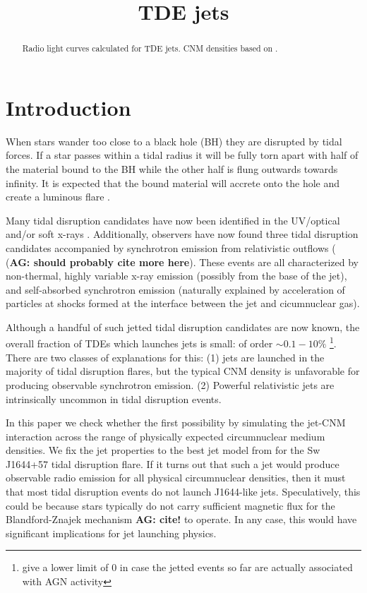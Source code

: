 \documentclass[usenatbib,fleqn]{mnras}
\title{TDE jets}
\begin{document}
\begin{abstract}
  Radio light curves calculated for TDE jets. CNM
  densities based on \citet{Generozov+2015}. 
\end{abstract}
\section{Introduction}
\label{sec:intro}
When stars wander too close to a black hole (BH) they are disrupted by
tidal forces. If a star passes within a tidal radius it will be fully
torn apart with half of the material bound to the BH while the
other half is flung outwards towards infinity. It is expected that the
bound material will accrete onto the hole and create a luminous flare
\citep{Hills1975, Carter+1982, Rees1988}. 

Many tidal disruption candidates have now been identified in the
UV/optical \citep{van-Velzen+2011, Gezari+2012, Chornock+2014,
  Arcavi+2014} and/or soft x-rays \citep{Esquej+2007}. Additionally,
observers have now found three tidal disruption candidates accompanied
by synchrotron emission from relativistic outflows
(\citealt{Bloom+2011, Zauderer+2011, Cenko+2012, Brown+2015} ({\bf AG:
  should probably cite more here}). These events are all characterized
by non-thermal, highly variable x-ray emission (possibly from the base
of the jet), and self-absorbed synchrotron emission (naturally
explained by acceleration of particles at shocks formed at the
interface between the jet and cicumnuclear gas).

Although a handful of such jetted tidal disruption candidates are now
known, the overall fraction of TDEs which launches jets is small: of
order $\sim 0.1-10\%$
\citep{van-Velzen+2013}\footnote{\citet{van-Velzen+2013} give a lower
  limit of 0 in case the jetted events so far are actually associated
  with AGN activity}.  There are two classes of explanations for this:
(1) jets are launched in the majority of tidal disruption flares, but
the typical CNM density is unfavorable for producing observable
synchrotron emission. (2) Powerful relativistic jets are intrinsically
uncommon in tidal disruption events.

In this paper we check whether the first possibility by simulating the
jet-CNM interaction across the range of physically expected
circumnuclear medium densities.  We fix the jet properties to the best
jet model from \citet{Mimica+2015} for the Sw J1644+57 tidal
disruption flare. If it turns out that such a jet would produce
observable radio emission for all physical circumnuclear densities,
then it must that most tidal disruption events do not launch
J1644-like jets.  Speculatively, this could be because stars typically
do not carry sufficient magnetic flux for the Blandford-Znajek
mechanism {\bf AG: cite!} to operate. In any case, this would have
significant implications for jet launching physics.
\end{document}
